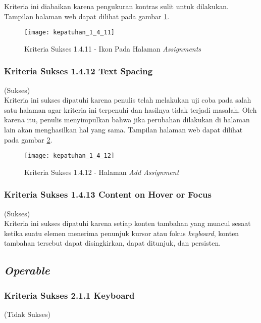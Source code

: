 Kriteria ini diabaikan karena pengukuran kontras sulit untuk dilakukan. Tampilan halaman web dapat dilihat pada gambar \ref{fig:kepatuhan_1_4_11_reflow}.
\begin{figure}[H]
	\centering  
	\texttt{[image: kepatuhan\_1\_4\_11]}  
	\caption[Kriteria Sukses 1.4.11 - Ikon Pada Halaman \textit{Assignments}]{Kriteria Sukses 1.4.11 - Ikon Pada Halaman \textit{Assignments}} 
	\label{fig:kepatuhan_1_4_11_reflow} 
\end{figure}

\subsubsection{Kriteria Sukses 1.4.12 Text Spacing}
\label{subsubsec:kepatuhan_kriteria_1.4.12}
(Sukses) \\

Kriteria ini sukses dipatuhi karena penulis telah melakukan uji coba pada salah satu halaman agar kriteria ini terpenuhi dan hasilnya tidak terjadi masalah. Oleh karena itu, penulis menyimpulkan bahwa jika perubahan dilakukan di halaman lain akan menghasilkan hal yang sama. Tampilan halaman web dapat dilihat pada gambar \ref{fig:kepatuhan_1_4_12}.
\begin{figure}[H]
	\centering  
	\texttt{[image: kepatuhan\_1\_4\_12]}  
	\caption[Kriteria Sukses 1.4.12 - Halaman \textit{Add Assignment}]{Kriteria Sukses 1.4.12 - Halaman \textit{Add Assignment}} 
	\label{fig:kepatuhan_1_4_12} 
\end{figure}


\subsubsection{Kriteria Sukses 1.4.13 Content on Hover or Focus}
\label{subsubsec:kepatuhan_kriteria_1.4.13}
(Sukses) \\

Kriteria ini sukses dipatuhi karena setiap konten tambahan yang muncul sesaat ketika suatu elemen menerima penunjuk kursor atau fokus \textit{keyboard}, konten tambahan tersebut dapat disingkirkan, dapat ditunjuk, dan persisten.

\subsection{\textit{Operable}}
\label{subsec:kepatuhan_operable}

\subsubsection{Kriteria Sukses 2.1.1 Keyboard}
\label{subsubsec:kepatuhan_kriteria_2.1.1}
(Tidak Sukses) \\

